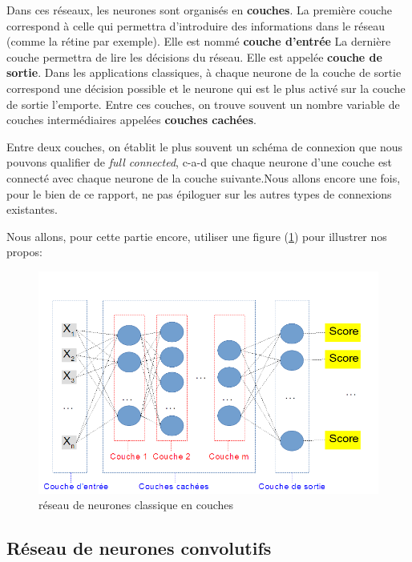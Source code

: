 Dans ces réseaux, les neurones sont organisés en \textbf{couches}.
La première couche correspond à celle qui permettra d'introduire des informations dans le réseau (comme la rétine par exemple). Elle est nommé \textbf{couche d'entrée}
La dernière couche permettra de lire les décisions du réseau. Elle est appelée \textbf{couche de sortie}. Dans les applications classiques, à chaque neurone de la couche de sortie correspond une décision possible et le neurone qui est le plus activé sur la couche de sortie l'emporte.
Entre ces couches, on trouve souvent un nombre variable de couches intermédiaires appelées \textbf{couches cachées}.

Entre deux couches, on établit le plus souvent un schéma de connexion que nous pouvons qualifier de \textit{full connected}, c-a-d que chaque neurone d'une couche est connecté avec chaque neurone de la couche suivante.Nous allons encore une fois, pour le bien de ce rapport, ne pas épiloguer sur les autres types de connexions existantes.\newline

Nous allons, pour cette partie encore, utiliser une figure (\ref{reseauClassique}) pour illustrer nos propos:

\begin{figure}[h]
\includegraphics[width=16.5cm]{./images/multicouche.png}
\caption{réseau de neurones classique en couches}
\label{reseauClassique}
\end{figure}


\hypertarget{Ruxe9seau-de-neurones-convolutif}{%
\subsection{Réseau de neurones convolutifs}
\label{Ruxe9seau-de-neurones-convolutif}}

